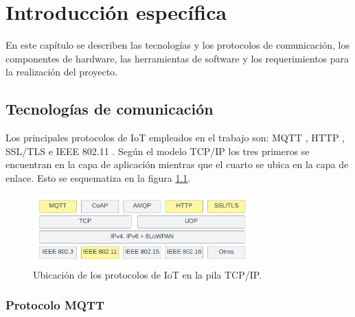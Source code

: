 \chapter{Introducción específica} %

\label{Chapter2}

En este capítulo se describen las tecnologías y los protocolos de comunicación, los componentes de hardware, las herramientas de software y los requerimientos para la realización del proyecto.

\section{Tecnologías de comunicación}
\label{sec:Tecnologías de comunicación}
Los principales protocolos de IoT empleados en el trabajo son: MQTT \citep{mqtt}, HTTP \citep{rfc1057}, SSL/TLS \citep{tls:1} e IEEE 802.11 \citep{802.11}. 
Según el modelo TCP/IP \citep{rfc1180} los tres primeros se encuentran en la capa de aplicación mientras que el cuarto se ubica en la capa de enlace. Esto se esquematiza en la figura \ref{fig:IotProtocols}.


\begin{figure}[h]
	\centering
	\includegraphics[width=0.75\textwidth]{./Figures/protocols.jpeg}
	\caption[Ubicación de los protocolos de IoT en la pila TCP/IP]{Ubicación de los protocolos de IoT en la pila TCP/IP.}
	\label{fig:IotProtocols}

\end{figure}
	



\subsection{Protocolo MQTT}
\label{sec:Protocolo MQTT}

